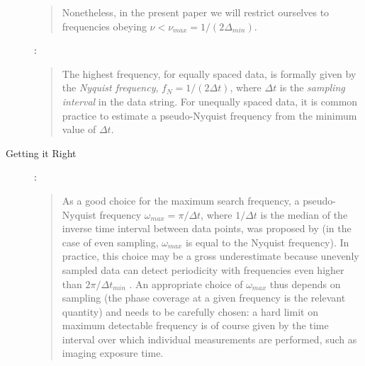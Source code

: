 \documentclass[preprint]{aastex}
\begin{document}
\begin{description}
\begin{quote}
Nonetheless, in the present paper we will restrict ourselves
to frequencies obeying
$\nu < \nu_{max} = 1/(2\Delta_{min})$.
\end{quote}

\citet{Hilditch01}:
\begin{quote}
The highest frequency, for equally spaced data, is formally given by the {\it Nyquist frequency}, $f_N = 1/(2\Delta t)$, where $\Delta t$ is the {\it sampling interval} in the data string.
For unequally spaced data, it is common practice to estimate a pseudo-Nyquist frequency from the minimum value of $\Delta t$.
\end{quote}

\item[Getting it Right]

\citet{ICVG2014}:
\begin{quote}
As a good choice for the maximum search frequency, a pseudo-Nyquist frequency $\omega_{max} = \pi/\Delta t$, where $1/\Delta t$ is the median of the inverse time interval between data points, was proposed by \citet{Debosscher07} (in the case of even sampling, $\omega_{max}$ is equal to the Nyquist frequency). In practice, this choice may be a gross underestimate because unevenly sampled data can detect periodicity with frequencies even higher than $2\pi / \Delta t_{min}$ \citep[see][]{Eyer99}. An appropriate choice of $\omega_{max}$ thus depends on sampling (the phase coverage at a given frequency is the relevant quantity) and needs to be carefully chosen: a hard limit on maximum detectable frequency is of course given by the time interval over which individual measurements are performed, such as imaging exposure time.
\end{quote}

\end{description}
\end{document}
